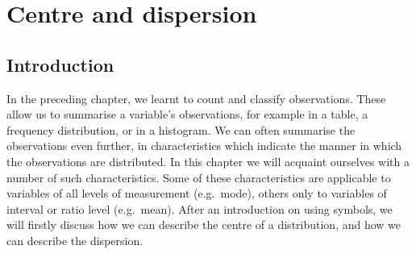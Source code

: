 \documentclass[
]{book}
\newenvironment{Shaded}{\begin{snugshade}}{\end{snugshade}}
\newcommand{\AttributeTok}[1]{\textcolor[rgb]{0.13,0.29,0.53}{#1}}
\newcommand{\CommentTok}[1]{\textcolor[rgb]{0.56,0.35,0.01}{\textit{#1}}}
\newcommand{\DecValTok}[1]{\textcolor[rgb]{0.00,0.00,0.81}{#1}}
\newcommand{\FloatTok}[1]{\textcolor[rgb]{0.00,0.00,0.81}{#1}}
\newcommand{\FunctionTok}[1]{\textcolor[rgb]{0.13,0.29,0.53}{\textbf{#1}}}
\newcommand{\NormalTok}[1]{#1}
\newcommand{\OtherTok}[1]{\textcolor[rgb]{0.56,0.35,0.01}{#1}}
\newcommand{\SpecialCharTok}[1]{\textcolor[rgb]{0.81,0.36,0.00}{\textbf{#1}}}
\newcommand{\StringTok}[1]{\textcolor[rgb]{0.31,0.60,0.02}{#1}}
\begin{document}
\begin{Shaded}
\end{Shaded}

\chapter{Centre and dispersion}\label{ch-centre-and-dispersion}

\section{Introduction}\label{introduction-4}

In the preceding chapter, we learnt to count and classify observations.
These allow us to summarise a variable's observations, for example
in a table, a frequency distribution, or in a histogram. We can often
summarise the observations even further, in characteristics which
indicate the manner in which the observations are distributed. In
this chapter we will acquaint ourselves with a number of such characteristics.
Some of these characteristics are applicable to variables of all levels of
measurement (e.g.~mode), others only to variables of interval or ratio
level (e.g.~mean). After an introduction on using symbols,
we will firstly discuss how we can describe the centre of a distribution,
and how we can describe the dispersion.
\end{document}
